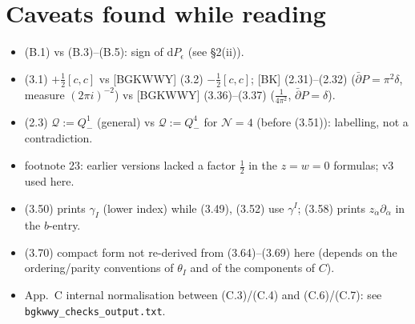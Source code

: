 \documentclass[10pt]{article}
\begin{document}
\section{Caveats found while reading}
\begin{itemize}
\item [GKW] (B.1) vs (B.3)--(B.5): sign of $\mathrm dP_\epsilon$ (see \S2(ii)).
\item [BK] (3.1) $+\frac12[c,c]$ vs [BGKWWY] (3.2) $-\frac12[c,c]$; [BK] (2.31)--(2.32) ($\bar\partial P=\pi^2\delta$, measure $(2\pi i)^{-2}$) vs [BGKWWY] (3.36)--(3.37) ($\frac1{4\pi^2}$, $\bar\partial P=\delta$).
\item [BK] (2.3) $\mathcal Q:=Q^1_-$ (general) vs $\mathcal Q:=Q^4_-$ for $\mathcal N=4$ (before (3.51)): labelling, not a contradiction.
\item [BK] footnote 23: earlier versions lacked a factor $\frac12$ in the $z=w=0$ formulas; v3 used here.
\item [BK] (3.50) prints $\gamma_I$ (lower index) while (3.49), (3.52) use $\gamma^I$; (3.58) prints $z_{\dot\alpha}\partial_{\dot\alpha}$ in the $b$-entry.
\item [BK] (3.70) compact form not re-derived from (3.64)--(3.69) here (depends on the ordering/parity conventions of $\theta_I$ and of the components of $C$).
\item [BGKWWY] App.~C internal normalisation between (C.3)/(C.4) and (C.6)/(C.7): see \texttt{bgkwwy\_checks\_output.txt}.
\end{itemize}
\end{document}
